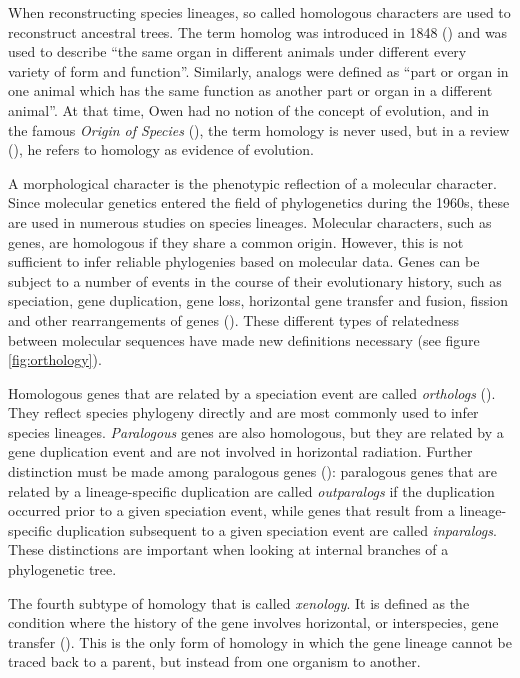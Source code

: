 When reconstructing species lineages, so called homologous characters are used
to reconstruct ancestral trees. The term homolog was introduced in 1848
(\cite{owen1848}) and was used to describe ``the same organ in different animals
under different every variety of form and function''. Similarly, analogs were
defined as ``part or organ in one animal which has the same function as another
part or organ in a different animal''. At that time, Owen had no notion of the
concept of evolution, and in the famous \emph{Origin of Species}
(\cite{darwin1859}), the term homology is never used, but in a review
(\cite{owen1860}), he refers to homology as evidence of evolution.

A morphological character is the phenotypic reflection of a molecular character.
Since molecular genetics entered the field of phylogenetics during the 1960s,
these are used in numerous studies on species lineages.  Molecular characters,
such as genes, are homologous if they share a common origin. However, this is
not sufficient to infer reliable phylogenies based on molecular data. Genes can
be subject to a number of events in the course of their evolutionary history,
such as speciation, gene duplication, gene loss, horizontal gene transfer and
fusion, fission and other rearrangements of genes (\cite{koonin2005}). These
different types of relatedness between molecular sequences have made new
definitions necessary (see figure \ref{fig:orthology}).



Homologous genes that are related by a speciation event are called
\emph{orthologs} (\cite{fitch1970}). They reflect species phylogeny directly and
are most commonly used to infer species lineages. \emph{Paralogous} genes are
also homologous, but they are related by a gene duplication event and are not
involved in horizontal radiation. Further distinction must be made among
paralogous genes (\cite{sonnhammer2002}): paralogous genes that are related by a
lineage-specific duplication are called \emph{outparalogs} if the duplication
occurred prior to a given speciation event, while genes that result from a
lineage-specific duplication subsequent to a given speciation event are called
\emph{inparalogs}.  These distinctions are important when looking at internal
branches of a phylogenetic tree.

The fourth subtype of homology that is called \emph{xenology}. It is defined as
the condition where the history of the gene involves horizontal, or
interspecies, gene transfer (\cite{gray1983}). This is the only form of homology
in which the gene lineage cannot be traced back to a parent, but instead from
one organism to another.

